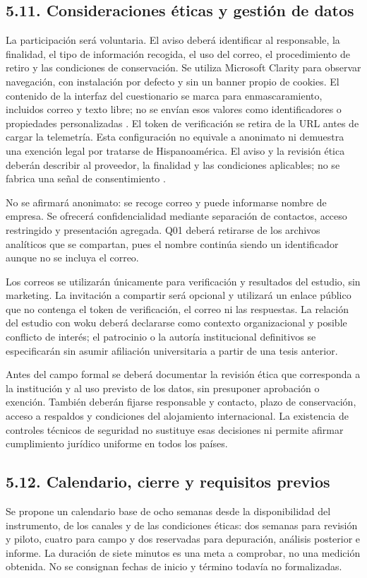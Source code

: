 \documentclass[12pt,letterpaper]{article}
\begin{document}
\subsection*{5.11. Consideraciones éticas y gestión de datos}
La participación será voluntaria. El aviso deberá identificar al responsable, la finalidad, el tipo de información recogida, el uso del correo, el procedimiento de retiro y las condiciones de conservación. Se utiliza Microsoft Clarity para observar navegación, con instalación por defecto y sin un banner propio de cookies. El contenido de la interfaz del cuestionario se marca para enmascaramiento, incluidos correo y texto libre; no se envían esos valores como identificadores o propiedades personalizadas \citep{claritymask}. El token de verificación se retira de la URL antes de cargar la telemetría. Esta configuración no equivale a anonimato ni demuestra una exención legal por tratarse de Hispanoamérica. El aviso y la revisión ética deberán describir al proveedor, la finalidad y las condiciones aplicables; no se fabrica una señal de consentimiento \citep{clarityconsent}.

No se afirmará anonimato: se recoge correo y puede informarse nombre de empresa. Se ofrecerá confidencialidad mediante separación de contactos, acceso restringido y presentación agregada. Q01 deberá retirarse de los archivos analíticos que se compartan, pues el nombre continúa siendo un identificador aunque no se incluya el correo.

Los correos se utilizarán únicamente para verificación y resultados del estudio, sin marketing. La invitación a compartir será opcional y utilizará un enlace público que no contenga el token de verificación, el correo ni las respuestas. La relación del estudio con woku deberá declararse como contexto organizacional y posible conflicto de interés; el patrocinio o la autoría institucional definitivos se especificarán sin asumir afiliación universitaria a partir de una tesis anterior.

Antes del campo formal se deberá documentar la revisión ética que corresponda a la institución y al uso previsto de los datos, sin presuponer aprobación o exención. También deberán fijarse responsable y contacto, plazo de conservación, acceso a respaldos y condiciones del alojamiento internacional. La existencia de controles técnicos de seguridad no sustituye esas decisiones ni permite afirmar cumplimiento jurídico uniforme en todos los países.

\subsection*{5.12. Calendario, cierre y requisitos previos}
Se propone un calendario base de ocho semanas desde la disponibilidad del instrumento, de los canales y de las condiciones éticas: dos semanas para revisión y piloto, cuatro para campo y dos reservadas para depuración, análisis posterior e informe. La duración de siete minutos es una meta a comprobar, no una medición obtenida. No se consignan fechas de inicio y término todavía no formalizadas.
\end{document}
